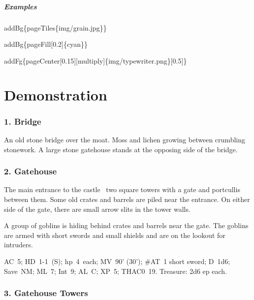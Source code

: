 \documentclass[english,12pt,openany,letterpaper]{book}
\begin{document}
\skipline

\paragraph{Examples}

\bs addBg\{\bs pageTiles\{img/grain.jpg\}\}

\bs addBg\{\bs pageFill[0.2]\{cyan\}\}

\bs addFg\{\bs pageCenter[0.15][multiply]\{img/typewriter.png\}[0.5]\}



\twocolumn

\clearFg

\chapter{Demonstration}

\subsection{1. Bridge}

An old stone bridge over the moat. Moss and lichen growing between crumbling stonework. A large stone gatehouse stands at the opposing side of the bridge.

\subsection{2. Gatehouse}

The main entrance to the castle \dash\ two square towers with a gate and portcullis between them. Some old crates and barrels are piled near the entrance. On either side of the gate, there are small arrow slits in the tower walls.

\tab A group of goblins is hiding behind crates and barrels near the gate. The goblins are armed with short swords and small shields and are on the lookout for intruders.


AC~5; HD~1-1~(S); hp~4~each; MV~90' (30'); \#AT~1 short sword; D~1d6; Save~NM; ML~7; Int~9; AL~C; XP~5; THAC0~19. Treasure: 2d6 ep each.

\subsection{3. Gatehouse Towers}
\end{document}
